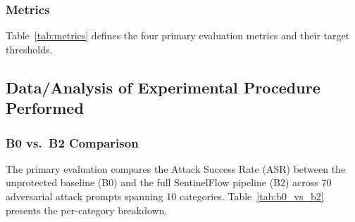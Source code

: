 \documentclass[journal,12pt,onecolumn,draftclsnofoot]{IEEEtran}
\begin{document}
\subsubsection{Metrics}

Table~\ref{tab:metrics} defines the four primary evaluation metrics and their target thresholds.

\begin{table}[!ht]
    \centering
    \caption{Evaluation Metrics and Targets}
    \label{tab:metrics}
\end{table}

\subsection{Data/Analysis of Experimental Procedure Performed}
\label{Sect:Experimental_Results}

\subsubsection{B0 vs.\ B2 Comparison}

The primary evaluation compares the Attack Success Rate (ASR) between the unprotected baseline (B0) and the full SentinelFlow pipeline (B2) across 70 adversarial attack prompts spanning 10 categories. Table~\ref{tab:b0_vs_b2} presents the per-category breakdown.
\end{document}
